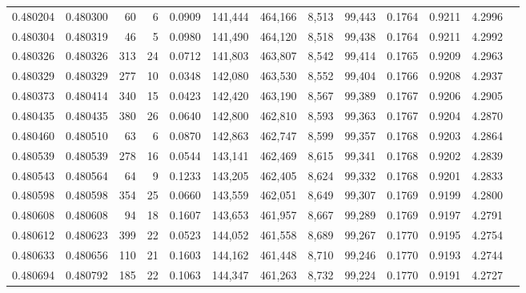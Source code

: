 \begin{tabular}{rrrrrrrrrrrrr}
0.480204 & 0.480300 &    60 &     6 &                                     0.0909 & 141,444 & 464,166 &   8,513 &  99,443 & 0.1764 & 0.9211 & 4.2996 \\
0.480304 & 0.480319 &    46 &     5 &                                     0.0980 & 141,490 & 464,120 &   8,518 &  99,438 & 0.1764 & 0.9211 & 4.2992 \\
0.480326 & 0.480326 &   313 &    24 &                                     0.0712 & 141,803 & 463,807 &   8,542 &  99,414 & 0.1765 & 0.9209 & 4.2963 \\
0.480329 & 0.480329 &   277 &    10 &                                     0.0348 & 142,080 & 463,530 &   8,552 &  99,404 & 0.1766 & 0.9208 & 4.2937 \\
0.480373 & 0.480414 &   340 &    15 &                                     0.0423 & 142,420 & 463,190 &   8,567 &  99,389 & 0.1767 & 0.9206 & 4.2905 \\
0.480435 & 0.480435 &   380 &    26 &                                     0.0640 & 142,800 & 462,810 &   8,593 &  99,363 & 0.1767 & 0.9204 & 4.2870 \\
0.480460 & 0.480510 &    63 &     6 &                                     0.0870 & 142,863 & 462,747 &   8,599 &  99,357 & 0.1768 & 0.9203 & 4.2864 \\
0.480539 & 0.480539 &   278 &    16 &                                     0.0544 & 143,141 & 462,469 &   8,615 &  99,341 & 0.1768 & 0.9202 & 4.2839 \\
0.480543 & 0.480564 &    64 &     9 &                                     0.1233 & 143,205 & 462,405 &   8,624 &  99,332 & 0.1768 & 0.9201 & 4.2833 \\
0.480598 & 0.480598 &   354 &    25 &                                     0.0660 & 143,559 & 462,051 &   8,649 &  99,307 & 0.1769 & 0.9199 & 4.2800 \\
0.480608 & 0.480608 &    94 &    18 &                                     0.1607 & 143,653 & 461,957 &   8,667 &  99,289 & 0.1769 & 0.9197 & 4.2791 \\
0.480612 & 0.480623 &   399 &    22 &                                     0.0523 & 144,052 & 461,558 &   8,689 &  99,267 & 0.1770 & 0.9195 & 4.2754 \\
0.480633 & 0.480656 &   110 &    21 &                                     0.1603 & 144,162 & 461,448 &   8,710 &  99,246 & 0.1770 & 0.9193 & 4.2744 \\
0.480694 & 0.480792 &   185 &    22 &                                     0.1063 & 144,347 & 461,263 &   8,732 &  99,224 & 0.1770 & 0.9191 & 4.2727 \\

\end{tabular}
